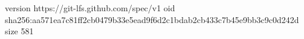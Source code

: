 version https://git-lfs.github.com/spec/v1
oid sha256:aa571ea7c81ff2cb0479b33e5ead9f6d2c1bdab2cb433c7b45e9bb3c9c0d242d
size 581
